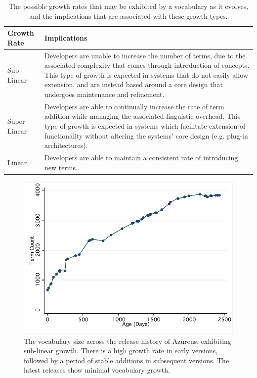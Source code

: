 \begin{table}[t]
\centering
\begin{tabular}{|p{}|p{}|}
\hline
{\bf Growth Rate} & {\bf Implications}\\
\hline
\hline
Sub-Linear
&
Developers are unable to increase the number of terms, due to the associated complexity that comes through introduction of concepts. This type of growth is expected in systems that do not easily allow extension, and are instead based around a core design that undergoes maintenance and refinement. 
\\
\hline
Super-Linear
&
Developers are able to continually increase the rate of term addition while managing the associated linguistic overhead. This type of growth is expected in systems which facilitate extension of functionality without altering the systems' core design (e.g. plug-in architectures).
\\
\hline
Linear
&
Developers are able to maintain a consistent rate of introducing new terms.
\\
\hline
\end{tabular}
\vspace{0.2cm}
\caption{The possible growth rates that may be exhibited by a vocabulary as it evolves, and the implications that are associated with these growth types.}
\label{tab:vocab_growth_rate_implications}
\vspace{-0.2cm}
\end{table}

\begin{figure}[t]
\centering
\includegraphics[width=\textwidth]{Figures/Vocab-AzureusGrowth.pdf}
\caption{The vocabulary size across the release history of Azureus, exhibiting sub-linear growth. There is a high growth rate in early versions, followed by a period of stable additions in subsequent versions. The latest releases show minimal vocabulary growth.}
\label{fig:vocab-growth-azureus}
\end{figure}

